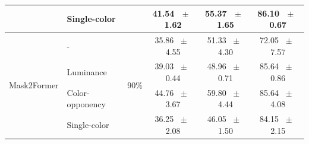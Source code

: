 \begin{table}[h]
\begin{tabular}{@{}l l c c c c@{}}
    & Single-color &  & 41.54 ~$\pm$~ 1.62 & 55.37 ~$\pm$~ 1.65 & 86.10 ~$\pm$~ 0.67 \\
    \midrule
    \multirow{4}{*}{Mask2Former} & - & \multirow{4}{*}{90\%} & 35.86 ~$\pm$~ 4.55 & 51.33 ~$\pm$~ 4.30 & 72.05 ~$\pm$~ 7.57 \\
    & Luminance &  & 39.03 ~$\pm$~ 0.44 & 48.96 ~$\pm$~ 0.71 & 85.64 ~$\pm$~ 0.86 \\
    & Color-opponency &  & 44.76 ~$\pm$~ 3.67 & 59.80 ~$\pm$~ 4.44 & 85.64 ~$\pm$~ 4.08 \\
    & Single-color &  & 36.25 ~$\pm$~ 2.08 & 46.05 ~$\pm$~ 1.50 & 84.15 ~$\pm$~ 2.15 \\
    \midrule
    \bottomrule
  \end{tabular}
  \label{tab:mask2former_acdc_rain}
\end{table}